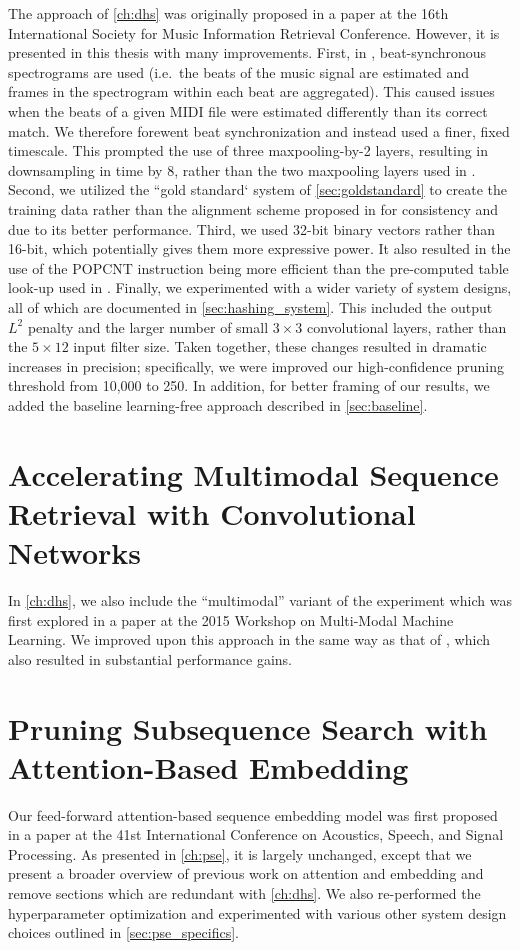 The approach of \cref{ch:dhs} was originally proposed in a paper at the 16th International Society for Music Information Retrieval Conference.
However, it is presented in this thesis with many improvements.
First, in \cite{raffel2015large}, beat-synchronous spectrograms are used (i.e.\ the beats of the music signal are estimated and frames in the spectrogram within each beat are aggregated).
This caused issues when the beats of a given MIDI file were estimated differently than its correct match.
We therefore forewent beat synchronization and instead used a finer, fixed timescale.
This prompted the use of three maxpooling-by-2 layers, resulting in downsampling in time by 8, rather than the two maxpooling layers used in \cite{raffel2015large}.
Second, we utilized the ``gold standard` system of \cref{sec:goldstandard} to create the training data rather than the alignment scheme proposed in \cite{raffel2015large} for consistency and due to its better performance.
Third, we used 32-bit binary vectors rather than 16-bit, which potentially gives them more expressive power.
It also resulted in the use of the POPCNT instruction being more efficient than the pre-computed table look-up used in \cite{raffel2015large}.
Finally, we experimented with a wider variety of system designs, all of which are documented in \cref{sec:hashing_system}.
This included the output $L^2$ penalty and the larger number of small $3 \times 3$ convolutional layers, rather than the $5 \times 12$ input filter size.
Taken together, these changes resulted in dramatic increases in precision; specifically, we were improved our high-confidence pruning threshold from 10,000 to 250.
In addition, for better framing of our results, we added the baseline learning-free approach described in \cref{sec:baseline}.

\section{Accelerating Multimodal Sequence Retrieval with Convolutional Networks \cite{raffel2015accelerating}}

In \cref{ch:dhs}, we also include the ``multimodal'' variant of the experiment which was first explored in a paper at the 2015 Workshop on Multi-Modal Machine Learning.
We improved upon this approach in the same way as that of \cite{raffel2015large}, which also resulted in substantial performance gains.

\section{Pruning Subsequence Search with Attention-Based Embedding \cite{raffel2016pruning}}

Our feed-forward attention-based sequence embedding model was first proposed in a paper at the 41st International Conference on Acoustics, Speech, and Signal Processing.
As presented in \cref{ch:pse}, it is largely unchanged, except that we present a broader overview of previous work on attention and embedding and remove sections which are redundant with \cref{ch:dhs}.
We also re-performed the hyperparameter optimization and experimented with various other system design choices outlined in \cref{sec:pse_specifics}.
